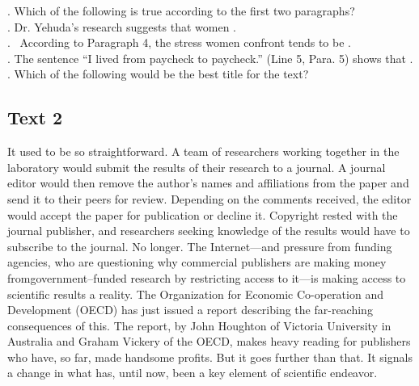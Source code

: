 \begin{questions} . Which of the following is true according to the first two paragraphs?
\\ . Dr. Yehuda’s research suggests that women .
\\ .  According to Paragraph 4, the stress women confront tends to be .
\\ . The sentence “I lived from paycheck to paycheck.” (Line 5, Para. 5) shows that .
\\ . Which of the following would be the best title for the text?
\\ \end{questions}      \subsection{Text 2}
It used to be so straightforward. A team of researchers working together in the laboratory would submit the results of their research to a journal. A journal editor would then remove the author’s names and affiliations from the paper and send it to their peers for review. Depending on the comments received, the editor would accept the paper for publication or decline it. Copyright rested with the journal publisher, and researchers seeking knowledge of the results would have to subscribe to the journal.
No longer. The Internet—and pressure from funding agencies, who are questioning why commercial publishers are making money fromgovernment–funded research by restricting access to it—is making access to scientific results a reality. The Organization for Economic Co-operation and Development (OECD) has just issued a report describing the far-reaching consequences of this. The report, by John Houghton of Victoria University in Australia and Graham Vickery of the OECD, makes heavy reading for publishers who have, so far, made handsome profits. But it goes further than that. It signals a change in what has, until now, been a key element of scientific endeavor.

